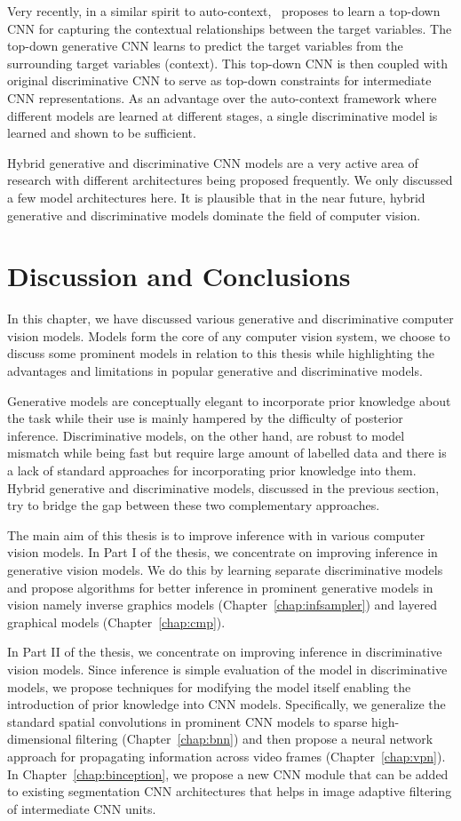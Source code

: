 Very recently, in a similar spirit to auto-context,~\cite{saining16} proposes to learn
a top-down CNN for capturing the contextual relationships between the
target variables. The top-down generative CNN learns to predict the target variables
from the surrounding target variables (context).
This top-down CNN is then coupled with original discriminative
CNN to serve as top-down constraints for intermediate CNN representations.
As an advantage over the auto-context framework where different models are learned
at different stages, a single discriminative model is learned and shown to be sufficient.

Hybrid generative and discriminative CNN models are a very active area of
research with different architectures being proposed frequently.
We only discussed a few model architectures here.
It is plausible that
in the near future, hybrid generative and discriminative models dominate
the field of computer vision.

\section{Discussion and Conclusions}

In this chapter, we have discussed various generative and discriminative computer vision models.
Models form the core of any computer vision system,
we choose to discuss some prominent models in relation
to this thesis while highlighting the advantages and limitations in
popular generative and discriminative models.

Generative models are conceptually elegant to incorporate prior knowledge about
the task while their use is mainly hampered by the difficulty of posterior inference.
Discriminative models, on the other hand, are robust to model mismatch while
being fast but require large amount of labelled data and there is a lack of standard
approaches for incorporating prior knowledge into them. Hybrid generative and
discriminative models, discussed in the previous section, try to bridge the gap
between these two complementary approaches.

The main aim of this thesis is to improve inference with in various computer
vision models. In Part I of the thesis, we concentrate on improving inference
in generative vision models. We do this by learning separate discriminative models
and propose algorithms for better inference in prominent generative models in
vision namely inverse graphics models (Chapter~\ref{chap:infsampler})
and layered graphical models (Chapter~\ref{chap:cmp}).

In Part II of the thesis, we concentrate on improving inference in discriminative
vision models. Since inference is simple evaluation of the model in discriminative models, we
propose techniques for modifying the model itself enabling the introduction of
prior knowledge into CNN models. Specifically, we generalize the standard spatial convolutions
in prominent CNN models to sparse high-dimensional filtering (Chapter~\ref{chap:bnn}) and then
propose a neural network approach for propagating information across video frames (Chapter~\ref{chap:vpn}).
In Chapter~\ref{chap:binception}, we propose a new CNN module that can be added to existing
segmentation CNN architectures that helps in image adaptive filtering of intermediate CNN units.
